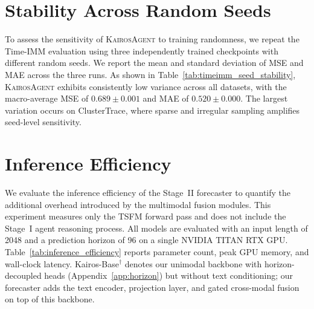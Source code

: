 \documentclass[11pt]{article}
\newcommand{\method}{\textsc{KairosAgent}\xspace}
\begin{document}
\section{Stability Across Random Seeds}
\label{app:stability}

To assess the sensitivity of \method to training randomness, we repeat the Time-IMM evaluation using three independently trained checkpoints with different random seeds.
We report the mean and standard deviation of MSE and MAE across the three runs.
As shown in Table~\ref{tab:timeimm_seed_stability}, \method exhibits consistently low variance across all datasets, with the macro-average MSE of $0.689 \pm 0.001$ and MAE of $0.520 \pm 0.000$.
The largest variation occurs on ClusterTrace, where sparse and irregular sampling amplifies seed-level sensitivity.

\begin{table}[htbp]
\centering
\caption{Stability of \method on Time-IMM across three random seeds (mean $\pm$ std). Lower is better.}
\label{tab:timeimm_seed_stability}
\end{table}

\section{Inference Efficiency}
\label{app:inference_efficiency}

We evaluate the inference efficiency of the Stage~II forecaster to quantify the additional overhead introduced by the multimodal fusion modules.
This experiment measures only the TSFM forward pass and does not include the Stage~I agent reasoning process.
All models are evaluated with an input length of 2048 and a prediction horizon of 96 on a single NVIDIA TITAN RTX GPU.
Table~\ref{tab:inference_efficiency} reports parameter count, peak GPU memory, and wall-clock latency.
Kairos-Base$^\dagger$ denotes our unimodal backbone with horizon-decoupled heads (Appendix~\ref{app:horizon}) but without text conditioning; our forecaster adds the text encoder, projection layer, and gated cross-modal fusion on top of this backbone.
\end{document}
